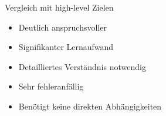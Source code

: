 \begin{frame}{Vergleich mit high-level Zielen}

	\begin{itemize}
		\item<1-> Deutlich anspruchsvoller
		\item<2-> Signifikanter Lernaufwand
		\item<3-> Detailliertes Verständnis notwendig
		\item<4-> Sehr fehleranfällig
		\item<5-> Benötigt keine direkten Abhängigkeiten
	\end{itemize}
\end{frame}
